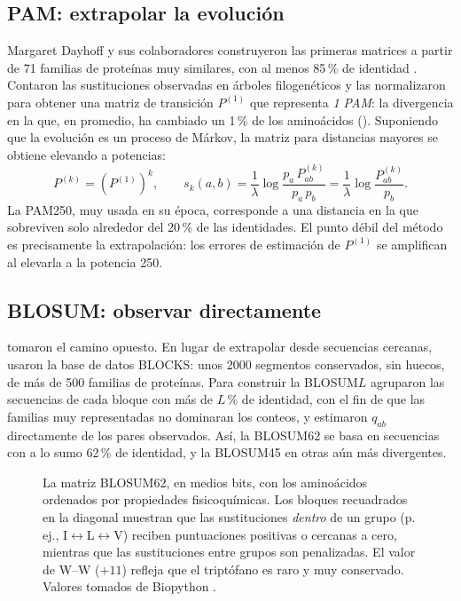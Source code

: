 \subsection{PAM: extrapolar la evolución}

Margaret Dayhoff y sus colaboradores construyeron las primeras matrices a partir de 71 familias de proteínas muy similares, con al menos 85\,\% de identidad \parencite{c03-dayhoff1978}. Contaron las sustituciones observadas en árboles filogenéticos y las normalizaron para obtener una matriz de transición $P^{(1)}$ que representa \emph{1 PAM}: la divergencia en la que, en promedio, ha cambiado un 1\,\% de los aminoácidos (). Suponiendo que la evolución es un proceso de Márkov, la matriz para distancias mayores se obtiene elevando a potencias:
\begin{equation}\label{eq:03-pam}
P^{(k)} = \left(P^{(1)}\right)^{k}, \qquad s_k(a,b) = \frac{1}{\lambda}\log\frac{p_a\,P^{(k)}_{ab}}{p_a\,p_b} = \frac{1}{\lambda}\log\frac{P^{(k)}_{ab}}{p_b}.
\end{equation}
La PAM250, muy usada en su época, corresponde a una distancia en la que sobreviven solo alrededor del 20\,\% de las identidades. El punto débil del método es precisamente la extrapolación: los errores de estimación de $P^{(1)}$ se amplifican al elevarla a la potencia 250.

\subsection{BLOSUM: observar directamente}

\textcite{c03-henikoff1992} tomaron el camino opuesto. En lugar de extrapolar desde secuencias cercanas, usaron la base de datos BLOCKS: unos 2000 segmentos conservados, sin huecos, de más de 500 familias de proteínas. Para construir la BLOSUM$L$ agruparon las secuencias de cada bloque con más de $L\,\%$ de identidad, con el fin de que las familias muy representadas no dominaran los conteos, y estimaron $q_{ab}$ directamente de los pares observados. Así, la BLOSUM62 se basa en secuencias con a lo sumo 62\,\% de identidad, y la BLOSUM45 en otras aún más divergentes.

\begin{figure}[t]
  \centering
  
  \caption[La matriz BLOSUM62]{La matriz BLOSUM62, en medios bits, con los aminoácidos ordenados por propiedades fisicoquímicas. Los bloques recuadrados en la diagonal muestran que las sustituciones \emph{dentro} de un grupo (p.\,ej., I$\leftrightarrow$L$\leftrightarrow$V) reciben puntuaciones positivas o cercanas a cero, mientras que las sustituciones entre grupos son penalizadas. El valor de W–W ($+11$) refleja que el triptófano es raro y muy conservado. Valores tomados de Biopython \parencite{c03-cock2009}.}
  \label{fig:03-blosum}
\end{figure}

